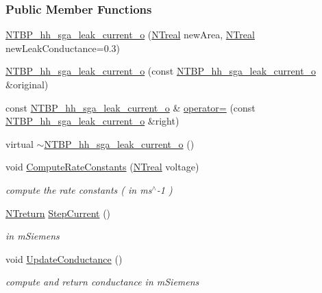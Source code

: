 \subsubsection*{Public Member Functions}
\begin{DoxyCompactItemize}
\item 
\hyperlink{class_n_t_b_p__hh__sga__leak__current__o_a7d8b0225b91dda70cc74639d80b0646f}{NTBP\_\-hh\_\-sga\_\-leak\_\-current\_\-o} (\hyperlink{nt__types_8h_a814a97893e9deb1eedcc7604529ba80d}{NTreal} newArea, \hyperlink{nt__types_8h_a814a97893e9deb1eedcc7604529ba80d}{NTreal} newLeakConductance=0.3)
\item 
\hyperlink{class_n_t_b_p__hh__sga__leak__current__o_a06289191f3855f70cb632658ac2a209a}{NTBP\_\-hh\_\-sga\_\-leak\_\-current\_\-o} (const \hyperlink{class_n_t_b_p__hh__sga__leak__current__o}{NTBP\_\-hh\_\-sga\_\-leak\_\-current\_\-o} \&original)
\item 
const \hyperlink{class_n_t_b_p__hh__sga__leak__current__o}{NTBP\_\-hh\_\-sga\_\-leak\_\-current\_\-o} \& \hyperlink{class_n_t_b_p__hh__sga__leak__current__o_ad7381b86647ff01eae8e310e37b97834}{operator=} (const \hyperlink{class_n_t_b_p__hh__sga__leak__current__o}{NTBP\_\-hh\_\-sga\_\-leak\_\-current\_\-o} \&right)
\item 
virtual \hyperlink{class_n_t_b_p__hh__sga__leak__current__o_a9b7b04ae3c9054921317387e62ea4c8b}{$\sim$NTBP\_\-hh\_\-sga\_\-leak\_\-current\_\-o} ()
\item 
void \hyperlink{class_n_t_b_p__hh__sga__leak__current__o_a9fb1c721818a541a35609aaf6d574960}{ComputeRateConstants} (\hyperlink{nt__types_8h_a814a97893e9deb1eedcc7604529ba80d}{NTreal} voltage)
\begin{DoxyCompactList}\small\item\em compute the rate constants ( in ms$^\wedge$-\/1 ) \item\end{DoxyCompactList}\item 
\hyperlink{nt__types_8h_ab9564ee8f091e809d21b8451c6683c53}{NTreturn} \hyperlink{class_n_t_b_p__hh__sga__leak__current__o_a8114a02efc68dead1cdde1e9b37051f0}{StepCurrent} ()
\begin{DoxyCompactList}\small\item\em in mSiemens \item\end{DoxyCompactList}\item 
void \hyperlink{class_n_t_b_p__hh__sga__leak__current__o_ab4d1fe20298ee0257da1a11e49abf656}{UpdateConductance} ()
\begin{DoxyCompactList}\small\item\em compute and return conductance in mSiemens \item\end{DoxyCompactList}\item 

\end{DoxyCompactItemize}
